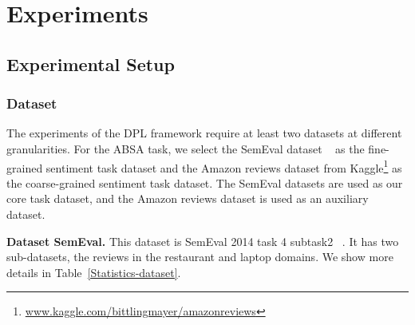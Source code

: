\documentclass[11pt]{article}
\begin{document}
\begin{table}
\centering
{}
\caption{\label{Statistics-dataset} Statistics of SemEval 2014 task 4 subtask 2.}
\end{table}


\section{Experiments}




\subsection{Experimental Setup}

\subsubsection{Dataset}
The experiments of the DPL framework require at least two datasets at different granularities.
For the ABSA task, we select the SemEval dataset ~\cite{pontikisemeval} as the fine-grained sentiment task dataset and the Amazon reviews dataset from Kaggle\footnote{\url{www.kaggle.com/bittlingmayer/amazonreviews}} as the coarse-grained sentiment task dataset. The SemEval datasets are used as our core task dataset, and the Amazon reviews dataset is used as an auxiliary dataset.








\textbf{Dataset SemEval.}
This dataset is SemEval 2014 task 4 subtask2 ~\cite{pontikisemeval}.
It has two sub-datasets, the reviews in the restaurant and laptop domains.
We show more details in Table~\ref{Statistics-dataset}. 
\end{document}
